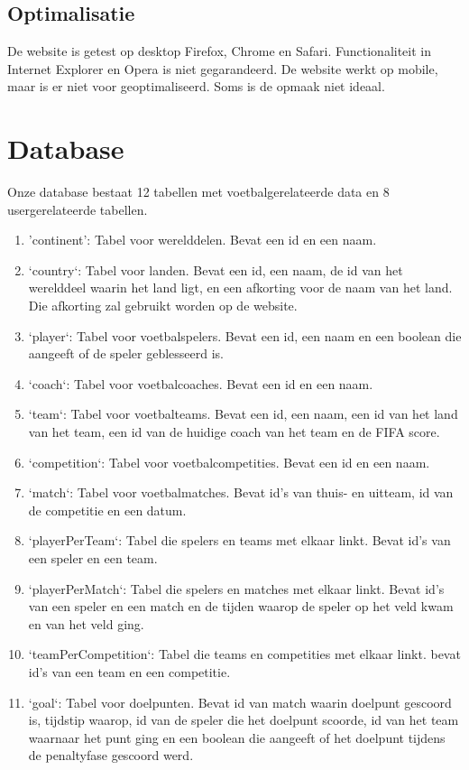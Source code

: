 \documentclass[11pt, a4paper]{article}
\begin{document}
\subsection{Optimalisatie}
De website is getest op desktop Firefox, Chrome en Safari. Functionaliteit in Internet Explorer en Opera is niet gegarandeerd. De website werkt op mobile, maar is er niet voor geoptimaliseerd. Soms is de opmaak niet ideaal.


\section{Database}
Onze database bestaat 12 tabellen met voetbalgerelateerde data en 8 usergerelateerde tabellen.
\begin{enumerate}
\item 'continent': Tabel voor werelddelen. Bevat een id en een naam.
\item `country`: Tabel voor landen. Bevat een id, een naam, de id van het werelddeel waarin het land ligt, en een afkorting voor de naam van het land. Die afkorting zal gebruikt worden op de website.
\item `player`: Tabel voor voetbalspelers. Bevat een id, een naam en een boolean die aangeeft of de speler geblesseerd is.
\item `coach`: Tabel voor voetbalcoaches. Bevat een id en een naam.
\item `team`: Tabel voor voetbalteams. Bevat een id, een naam, een id van het land van het team, een id van de huidige coach van het team en de FIFA score.
\item `competition`: Tabel voor voetbalcompetities. Bevat een id en een naam.
\item `match`: Tabel voor voetbalmatches. Bevat id's van thuis- en uitteam, id van de competitie en een datum.
\item `playerPerTeam`: Tabel die spelers en teams met elkaar linkt. Bevat id's van een speler en een team.
\item `playerPerMatch`: Tabel die spelers en matches met elkaar linkt. Bevat id's van een speler en een match en de tijden waarop de speler op het veld kwam en van het veld ging.
\item `teamPerCompetition`: Tabel die teams en competities met elkaar linkt. bevat id's van een team en een competitie.
\item `goal`: Tabel voor doelpunten. Bevat id van match waarin doelpunt gescoord is, tijdstip waarop, id van de speler die het doelpunt scoorde, id van het team waarnaar het punt ging en een boolean die aangeeft of het doelpunt tijdens de penaltyfase gescoord werd.

\end{enumerate}
\end{document}
